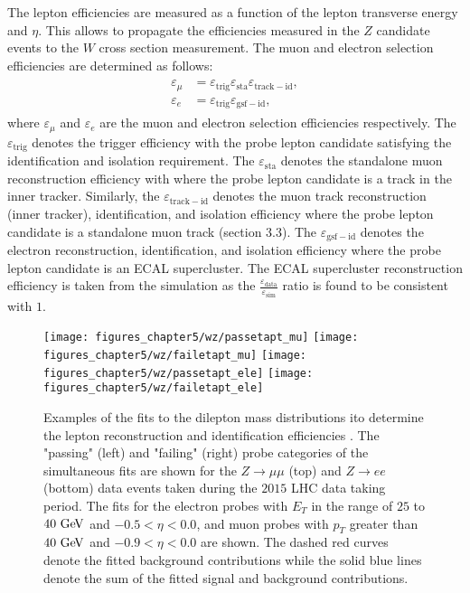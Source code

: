 The lepton efficiencies are measured as a function of the lepton transverse energy and $\eta$. This allows to propagate the efficiencies measured in the $Z$ candidate events to the $W$ cross section measurement. The muon and electron selection efficiencies are determined as follows: 
\begin{eqnarray} \label{eq:eff2}
\begin{aligned}
\varepsilon_{\mu} &=  \varepsilon_{\mathrm{trig}}\varepsilon_{\mathrm{sta}}\varepsilon_{\mathrm{track-id}}, \\
\varepsilon_{e} &=  \varepsilon_{\mathrm{trig}}\varepsilon_{\mathrm{gsf-id}},
\end{aligned}
\end{eqnarray}
where $\varepsilon_{\mu}$ and $\varepsilon_{e}$ are the muon and electron selection efficiencies respectively. The $\varepsilon_{\mathrm{trig}}$ denotes the trigger efficiency with the probe lepton candidate satisfying the identification and isolation requirement. The  $\varepsilon_{\mathrm{sta}}$ denotes the standalone muon reconstruction efficiency with where the probe lepton candidate is a track in the inner tracker. Similarly, the $\varepsilon_{\mathrm{track-id}}$ denotes the muon track reconstruction (inner tracker),  identification, and isolation efficiency where the probe lepton candidate is a standalone muon track (section 3.3). The $\varepsilon_{\mathrm{gsf-id}}$ denotes the electron reconstruction, identification, and isolation efficiency where the probe lepton candidate is an ECAL supercluster. The ECAL supercluster reconstruction efficiency is taken from the simulation as the $\frac{\varepsilon_{\mathrm{data}}}{\varepsilon_{\mathrm{sim}}}$ ratio is found to be consistent with $1$. 
\begin{figure}[h]
\centering
\texttt{[image: figures\_chapter5/wz/passetapt\_mu]}
\texttt{[image: figures\_chapter5/wz/failetapt\_mu]}
\texttt{[image: figures\_chapter5/wz/passetapt\_ele]}
\texttt{[image: figures\_chapter5/wz/failetapt\_ele]}
\caption{Examples of the fits to the dilepton mass distributions ito determine the lepton reconstruction and identification efficiencies . The "passing" (left) and "failing" (right) probe categories of the simultaneous fits are shown for the $Z\rightarrow \mu\mu$ (top) and $Z\rightarrow ee$ (bottom) data events taken during the $2015$ LHC data taking period. The fits for the electron probes with $E_{T}$ in the range of $25$ to $40~\mathrm{Ge\kern -0.1em V}$ and $-0.5<\eta<0.0$, and muon probes with $p_{T}$ greater than $40~\mathrm{Ge\kern -0.1em V}$ and $-0.9<\eta<0.0$ are shown. The dashed red curves denote the fitted background contributions while the solid blue lines denote the sum of the fitted signal and background contributions.}
\label{fig:tgp}
\end{figure}


